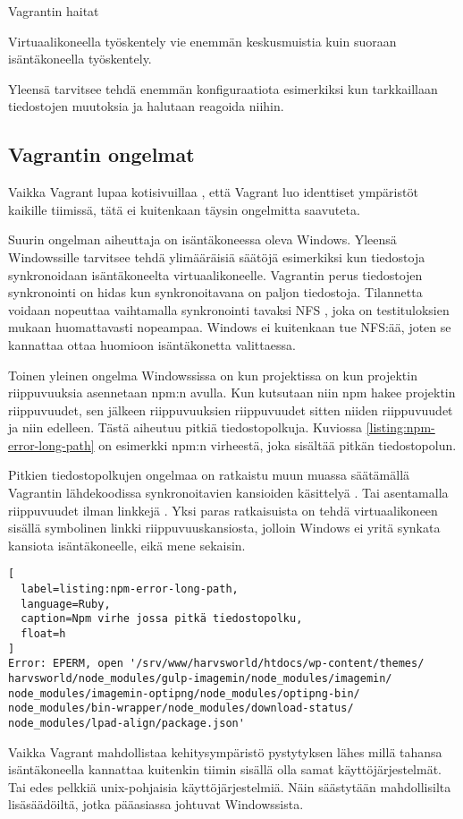 Vagrantin haitat
\begin{bullet-list}
  \item Virtuaalikoneella työskentely vie enemmän keskusmuistia kuin suoraan isäntäkoneella työskentely.
  \item Yleensä tarvitsee tehdä enemmän konfiguraatiota esimerkiksi kun tarkkaillaan tiedostojen muutoksia ja halutaan reagoida niihin.
\end{bullet-list}

\subsection{Vagrantin ongelmat}

Vaikka Vagrant lupaa kotisivuillaa \cite{link:vagrant}, että Vagrant luo identtiset ympäristöt kaikille tiimissä, tätä ei kuitenkaan täysin ongelmitta saavuteta.

Suurin ongelman aiheuttaja on isäntäkoneessa oleva Windows. Yleensä Windowssille tarvitsee tehdä ylimääräisiä säätöjä esimerkiksi kun tiedostoja synkronoidaan isäntäkoneelta virtuaalikoneelle. Vagrantin perus tiedostojen synkronointi on hidas \cite{link:vagrant-shared-folders} kun synkronoitavana on paljon tiedostoja. Tilannetta voidaan nopeuttaa vaihtamalla synkronointi tavaksi NFS \cite{link:nfs-wiki}, joka on testituloksien mukaan huomattavasti nopeampaa. Windows ei kuitenkaan tue NFS:ää, joten se kannattaa ottaa huomioon isäntäkonetta valittaessa.

Toinen yleinen ongelma Windowssissa on kun projektissa on kun projektin riippuvuuksia asennetaan npm:n avulla. Kun kutsutaan  niin npm hakee projektin riippuvuudet, sen jälkeen riippuvuuksien riippuvuudet sitten niiden riippuvuudet ja niin edelleen. Tästä aiheutuu pitkiä tiedostopolkuja. Kuviossa \ref{listing:npm-error-long-path} on esimerkki npm:n virheestä, joka sisältää pitkän tiedostopolun.

Pitkien tiedostopolkujen ongelmaa on ratkaistu muun muassa säätämällä Vagrantin lähdekoodissa synkronoitavien kansioiden käsittelyä \cite{link:fix-npm-on-vagrant-on-windows}. Tai asentamalla riippuvuudet ilman linkkejä \cite{link:npm-does-not-work-in-vagrant}. Yksi paras ratkaisuista on tehdä virtuaalikoneen sisällä symbolinen linkki riippuvuuskansiosta, jolloin Windows ei yritä synkata kansiota isäntäkoneelle, eikä mene sekaisin.

\begin{lstlisting}[
  label=listing:npm-error-long-path,
  language=Ruby,
  caption=Npm virhe jossa pitkä tiedostopolku,
  float=h
]
Error: EPERM, open '/srv/www/harvsworld/htdocs/wp-content/themes/
harvsworld/node_modules/gulp-imagemin/node_modules/imagemin/
node_modules/imagemin-optipng/node_modules/optipng-bin/
node_modules/bin-wrapper/node_modules/download-status/
node_modules/lpad-align/package.json'
\end{lstlisting}

Vaikka Vagrant mahdollistaa kehitysympäristö pystytyksen lähes millä tahansa isäntäkoneella kannattaa kuitenkin tiimin sisällä olla samat käyttöjärjestelmät. Tai edes pelkkiä unix-pohjaisia käyttöjärjestelmiä. Näin säästytään mahdollisilta lisäsäädöiltä, jotka pääasiassa johtuvat Windowssista.